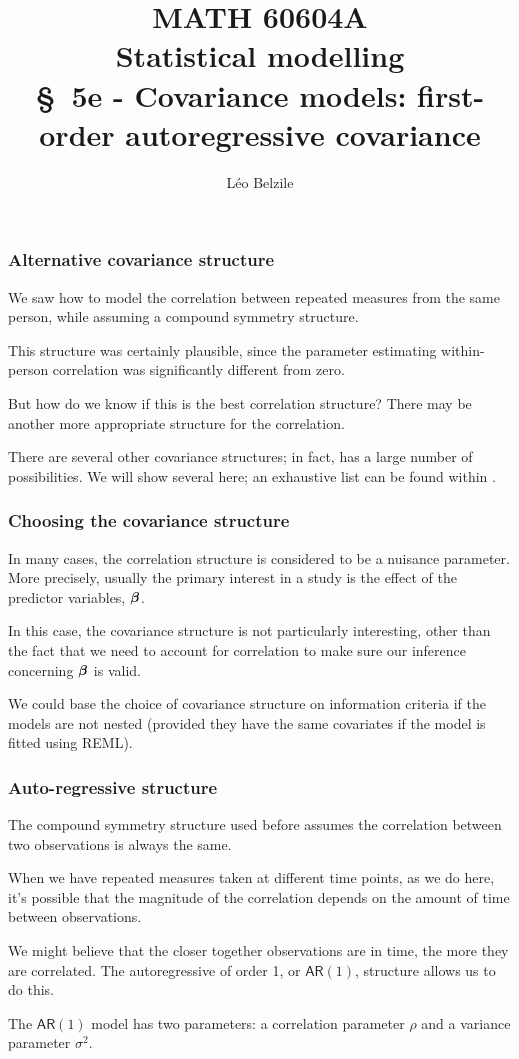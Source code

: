 \documentclass{beamer}
\title[\color{white}{MATH 60604A \S~5e - $\mathsf{AR}(1)$ covariance model}]{\texorpdfstring{MATH 60604A \\Statistical modelling \\ \S~5e - Covariance models: first-order autoregressive covariance}{MATH 60604A \\Statistical modelling \\ \S~5e - Covariance models: $\mathsf{AR}(1)$}}
\author{Léo Belzile}
\institute{HEC Montréal\\
Department of Decision Sciences}
\date{}
\begin{document}
\frame{\titlepage}

\begin{frame}
\frametitle{Alternative covariance structure}
\bi
\item We saw how to model the correlation between repeated measures from the same person, while assuming a compound symmetry structure. 
\item This structure was certainly plausible, since the parameter estimating within-person correlation was significantly different from zero. 
\item But how do we know if this is the best correlation structure? There may be another more appropriate structure for the correlation.
\item There are several other covariance structures; in fact, \SASlang{} has a large number of possibilities. We will show several here; an exhaustive list can be found within \SASlang{}.
\ei
\end{frame}

\begin{frame}
\frametitle{Choosing the covariance structure}
\bi
\item In many cases, the correlation structure is considered to be a nuisance parameter. More precisely, usually the primary interest in a study is the effect of the predictor variables, $\boldsymbol {\beta}$. 
\item In this case, the covariance structure is not particularly interesting, other than the fact that  we need to account for correlation to make sure our inference concerning $\boldsymbol {\beta}$ is valid. 
\item We could base the choice of covariance structure on information criteria if the models are not nested (provided they have the same covariates if the model is fitted using REML).
\ei
\end{frame}

\begin{frame}
\frametitle{Auto-regressive structure}
\bi
\item The compound symmetry structure used before assumes the correlation between two observations is always the same. 
\item When we have repeated measures taken at different time points, as we do here, 
it's possible that the magnitude of the correlation depends on the amount of time between observations. 
\item We might believe that the closer together observations
are in time, the more they are correlated. The \alert{autoregressive of order 1}, or \alert{$\mathsf{AR}(1)$}, structure allows us to do this.
\item The $\mathsf{AR}(1)$ model has two parameters: a correlation parameter $\rho$ and a variance parameter $\sigma^2$.
\ei
\end{frame}
\end{document}
